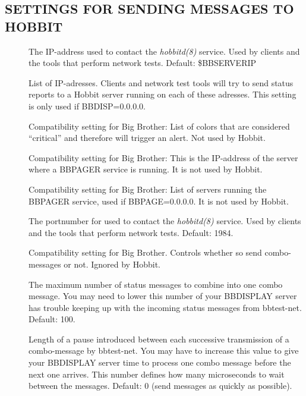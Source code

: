 \subsection{SETTINGS FOR SENDING MESSAGES TO HOBBIT}
\begin{description}
\item[] The IP-address used to contact the \emph{hobbitd(8)}
 service. Used by clients and the tools that perform network tests. Default: \$BBSERVERIP 

 

\item[] List of IP-adresses. Clients and network
  test tools will try to send status reports to a Hobbit server
  running on each of these adresses. This setting is only used if
  BBDISP=0.0.0.0. 


 

\item[] Compatibility setting for Big Brother: List
  of colors that are considered ``critical'' and therefore will
  trigger an alert. Not used by Hobbit. 


 

\item[] Compatibility setting for Big Brother: This is
  the IP-address of the server where a BBPAGER service is running. It
  is not used by Hobbit. 


 

\item[] Compatibility setting for Big Brother: List of
  servers running the BBPAGER service, used if BBPAGE=0.0.0.0. It is
  not used by Hobbit. 


 

\item[] The portnumber for used to contact the \emph{hobbitd(8)}
 service. Used by clients and the tools that perform network tests. Default: 1984. 

 

\item[] Compatibility setting for Big Brother. Controls
  whether so send combo-messages or not. Ignored by Hobbit. 


\item[] The maximum number of status messages
  to combine into one combo message. You may need to lower this number
  of your BBDISPLAY server has trouble keeping up with the incoming
  status messages from bbtest-net. Default: 100. 


\item[] Length of a pause introduced between
  each successive transmission of a combo-message by bbtest-net. You
  may have to increase this value to give your BBDISPLAY server time
  to process one combo message before the next one arrives. This
  number defines how many microseconds to wait between the
  messages. Default: 0 (send messages as quickly as possible). 


\end{description}
